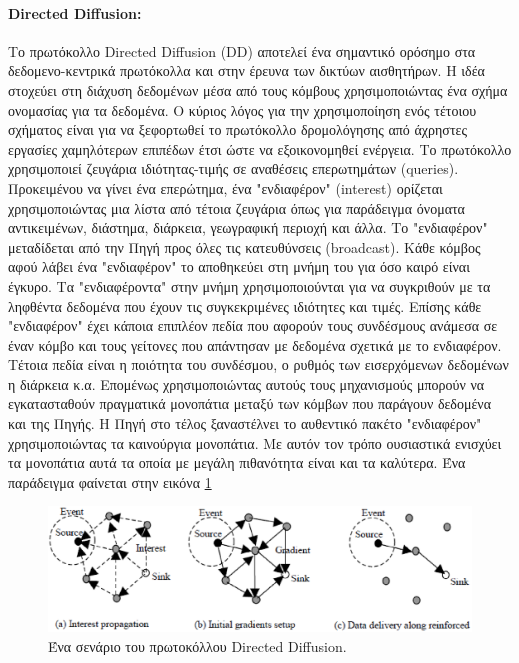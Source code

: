 \paragraph{Directed Diffusion:}  Το πρωτόκολλο Directed Diffusion (DD) \cite{directed_diffusion} αποτελεί ένα σημαντικό ορόσημο στα δεδομενο-κεντρικά πρωτόκολλα και
στην έρευνα των δικτύων αισθητήρων. Η ιδέα στοχεύει στη διάχυση δεδομένων μέσα από τους κόμβους χρησιμοποιώντας ένα σχήμα ονομασίας για τα δεδομένα. Ο κύριος λόγος
για την χρησιμοποίηση ενός τέτοιου σχήματος είναι για να ξεφορτωθεί το πρωτόκολλο δρομολόγησης από άχρηστες εργασίες χαμηλότερων επιπέδων έτσι ώστε να εξοικονομηθεί
ενέργεια. Το πρωτόκολλο χρησιμοποιεί ζευγάρια ιδιότητας-τιμής σε αναθέσεις επερωτημάτων (queries). Προκειμένου να γίνει ένα επερώτημα, ένα "ενδιαφέρον" (interest)
ορίζεται χρησιμοποιώντας μια λίστα από τέτοια ζευγάρια όπως για παράδειγμα όνοματα αντικειμένων, διάστημα, διάρκεια, γεωγραφική περιοχή και άλλα. Το "ενδιαφέρον"
μεταδίδεται από την Πηγή προς όλες τις κατευθύνσεις (broadcast). Κάθε κόμβος αφού λάβει ένα "ενδιαφέρον" το αποθηκεύει στη μνήμη του για όσο καιρό είναι έγκυρο. Τα
"ενδιαφέροντα" στην μνήμη χρησιμοποιούνται για να συγκριθούν με τα ληφθέντα δεδομένα που έχουν τις συγκεκριμένες ιδιότητες και τιμές. Επίσης κάθε "ενδιαφέρον" έχει
κάποια επιπλέον πεδία που αφορούν τους συνδέσμους ανάμεσα σε έναν κόμβο και τους γείτονες που απάντησαν με δεδομένα σχετικά με το ενδιαφέρον. Tέτοια πεδία είναι η
ποιότητα του συνδέσμου, ο ρυθμός των εισερχόμενων δεδομένων η διάρκεια κ.α. Επομένως χρησιμοποιώντας αυτούς τους μηχανισμούς μπορούν να εγκατασταθούν πραγματικά
μονοπάτια μεταξύ των κόμβων που παράγουν δεδομένα και της Πηγής. Η Πηγή στο τέλος ξαναστέλνει το αυθεντικό πακέτο "ενδιαφέρον" χρησιμοποιώντας τα καινούργια
μονοπάτια. Με αυτόν τον τρόπο ουσιαστικά ενισχύει τα μονοπάτια αυτά τα οποία με μεγάλη πιθανότητα είναι και τα καλύτερα. Ένα παράδειγμα φαίνεται στην εικόνα
\ref{fig:dd_example}

\begin{figure}[h]
	\centering
	\includegraphics[width=\textwidth]{images/directed_diffusion.eps}
	\caption{Ένα σενάριο του πρωτοκόλλου Directed Diffusion.}
	\label{fig:dd_example}
\end{figure}

